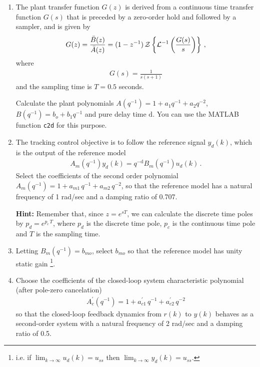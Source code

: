 \begin{enumerate}
    \item
    The plant transfer function $G(z)$ is derived from a continuous time transfer function $G(s)$ that is preceded by a zero-order hold and followed by a sampler, and is given by
    \begin{align*}
        G(z) = \frac{\bar{B}(z)}{\bar{A}(z)}
            = (1 - z^{-1}) \, {\cal Z} \left \{ {\cal L}^{-1} \left ( \frac{G(s)}{s} \right ) \right \}\,,
    \end{align*}
    where
    \begin{align*}
        G(s) = \frac{1}{s(s + 1)}
    \end{align*}
    and the sampling time is $T = 0.5$ seconds.

    Calculate the plant polynomials $A(q^{-1}) = 1 + a_1 q^{-1} + a_2 q^{-2}$,  $B(q^{-1}) = b_o +  b_1 q^{-1}$  and pure delay time $\textrm{d}$. You can use the MATLAB function {\tt c2d} for this purpose.\\

    \item
    \label{sec:track}
    The tracking control objective is to follow the reference signal $y_d(k)$, which is the output of the reference model
    \begin{align}
        A_m (q^{-1}) y_d(k) = q^{-\textrm{d}} B_m(q^{-1}) u_d(k) \,.
        \label{eq:yd_def}
    \end{align}
    Select the coefficients of the second order polynomial $A_m(q^{-1}) = 1 + a_{m1}\, q^{-1} + a_{m2} \, q^{-2}$, so that the reference model has a natural frequency of 1 rad/sec and a damping ratio of 0.707.

    \textbf{Hint:} Remember that, since $z = e^{s T}$, we can calculate the discrete time poles by $p_d = e^{p_c \, T}$, where $p_d$ is the discrete time pole, $p_c$ is the continuous time pole and $T$ is the sampling time.

    \item
    Letting $B_m(q^{-1}) = b_{mo}$, select $b_{mo}$ so that the reference model has unity static gain
    \footnote{i.e. if $\lim_{k \to \infty} u_d(k)  = u_{ss}$  then  $\lim_{k \to \infty} y_d(k)  = u_{ss}$.}.

    \item
    Choose the coefficients of the closed-loop system characteristic polynomial (after pole-zero cancelation)
    \begin{align*}
        A_c^{' } (q^{-1}) =  1 + a^{'}_{c1}\, q^{-1} + a^{'}_{c2} \, q^{-2}
    \end{align*}
    so that the closed-loop feedback dynamics from $r(k)$ to $y(k)$ behaves as a second-order system with  a natural frequency of 2 rad/sec and a damping ratio of 0.5.


\end{enumerate}
